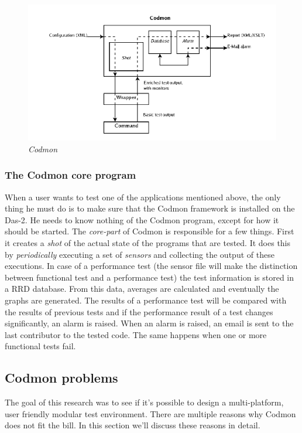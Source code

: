\documentclass{article}
\begin{document}
\begin{figure}[!ht]
  \caption{\emph{Codmon}}
  \centering
    \includegraphics[scale=0.5]{codmon}
\end{figure}

\subsubsection{The Codmon core program}
\label{coreprogram}
\noindent When a user wants to test one of the applications mentioned above, the only thing he must do is to make sure that the Codmon framework is installed on the Das-2. He needs to know nothing of the 
Codmon program, except for how it should be started. The \emph{core-part} of Codmon is responsible for a few things. First it creates a \emph{shot} of the actual state of the programs that are 
tested. It does this by \emph{periodically} executing a set of \emph{sensors} and collecting the output of these executions. In case of a performance test (the sensor file will make the distinction between 
functional test and a performance test) the test information is stored in a RRD database\cite{RRD}. From this data, averages are calculated and eventually the graphs are generated\cite{Codmon}. The results 
of a performance test will be compared with the results of previous tests and if the performance result of a test changes significantly, an alarm is raised. When an alarm is raised, an email is sent 
to the last contributor to the tested code. The same happens when one or more functional tests fail.\\
 

\subsection{Codmon problems}
\label{subsec:CodmonProblems}
The goal of this research was to see if it's possible to design a multi-platform, user friendly modular test environment. There are multiple reasons why Codmon does not fit the bill. In this section
we'll discuss these reasons in detail.
 
\end{document}
